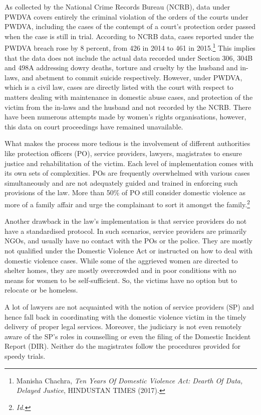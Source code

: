 \begin{multicols}{2}

\noi
As collected by the National Crime Records Bureau (NCRB), data under PWDVA covers
entirely the criminal violation of the orders of the courts under PWDVA, including the cases
of the contempt of a court’s protection order passed when the case is still in trial. According
to NCRB data, cases reported under the PWDVA breach rose by 8 percent, from 426 in 2014
to 461 in 2015.\footnote{Manisha Chachra, \textit{Ten Years Of Domestic Violence Act: Dearth Of Data, Delayed Justice}, HINDUSTAN
TIMES (2017).} This implies that the data does not include the actual data recorded under
Section 306, 304B and 498A addressing dowry deaths, torture and cruelty by the husband and
in-laws, and abetment to commit suicide respectively. However, under PWDVA, which is a
civil law, cases are directly listed with the court with respect to matters dealing with
maintenance in domestic abuse cases, and protection of the victim from the in-laws and the
husband and not recorded by the NCRB. There have been numerous attempts made by
women's rights organisations, however, this data on court proceedings have remained
unavailable. 

\noi
What makes the process more tedious is the involvement of different authorities like
protection officers (PO), service providers, lawyers, magistrates to ensure justice and
rehabilitation of the victim. Each level of implementation comes with its own sets of
complexities. POs are frequently overwhelmed with various cases simultaneously and are not
adequately guided and trained in enforcing such provisions of the law. More than 50\% of PO
still consider domestic violence as more of a family affair and urge the complainant to sort it
amongst the family.\footnote{\textit{Id.}}

\noi
Another drawback in the law's implementation is that service providers do not have a
standardised protocol. In such scenarios, service providers are primarily NGOs, and usually
have no contact with the POs or the police. They are mostly not qualified under the Domestic
Violence Act or instructed on how to deal with domestic violence cases. While some of the
aggrieved women are directed to shelter homes, they are mostly overcrowded and in poor
conditions with no means for women to be self-sufficient. So, the victims have no option but
to relocate or be homeless. 

\noi
A lot of lawyers are not acquainted with the notion of service providers (SP) and hence fall
back in coordinating with the domestic violence victim in the timely delivery of proper legal
services. Moreover, the judiciary is not even remotely aware of the SP’s roles in counselling
or even the filing of the Domestic Incident Report (DIR). Neither do the magistrates follow
the procedures provided for speedy trials. 


\end{multicols}
